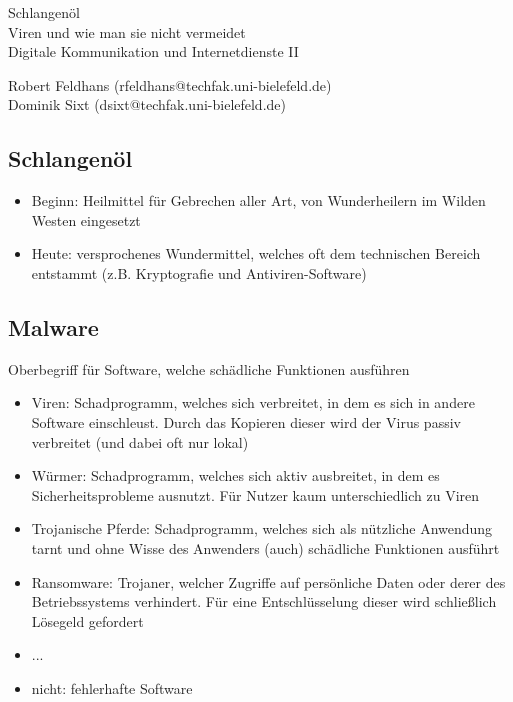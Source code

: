 \documentclass[
	11pt,
	DIV=15,
	parskip=full,    %
]{scrartcl}
\begin{document}
	\begin{center}
		\begin{onehalfspace}
			\Large{Schlangenöl\\Viren und wie man sie nicht vermeidet}\\
			\large{Digitale Kommunikation und Internetdienste II}\\
		\end{onehalfspace}
		\large{Robert Feldhans (rfeldhans@techfak.uni-bielefeld.de)}\\
		\large{Dominik Sixt (dsixt@techfak.uni-bielefeld.de)}
		\end{center}
	\hrulefill
	
	\subsection*{Schlangenöl}
	\begin{itemize}
		\itemsep-1pt
		\item Beginn: Heilmittel für Gebrechen aller Art, von Wunderheilern im Wilden Westen eingesetzt
		\item Heute: versprochenes Wundermittel, welches oft dem technischen Bereich entstammt (z.B. Kryptografie und Antiviren-Software)
	\end{itemize}
	
	\subsection*{Malware}
	Oberbegriff für Software, welche schädliche Funktionen ausführen
	
	\begin{itemize}
		\itemsep-1pt
		\item Viren: Schadprogramm, welches sich verbreitet, in dem es sich in andere Software einschleust. Durch das Kopieren dieser wird der Virus passiv verbreitet (und dabei oft nur lokal)
		\item Würmer: Schadprogramm, welches sich aktiv ausbreitet, in dem es Sicherheitsprobleme ausnutzt. Für Nutzer kaum unterschiedlich zu Viren
		\item Trojanische Pferde: Schadprogramm, welches sich als nützliche Anwendung tarnt und ohne Wisse des Anwenders (auch) schädliche Funktionen ausführt
		\item Ransomware: Trojaner, welcher Zugriffe auf persönliche Daten oder derer des Betriebssystems verhindert. Für eine Entschlüsselung dieser wird schließlich Lösegeld gefordert
		\item ...
		\item nicht: fehlerhafte Software	
	\end{itemize}
	
\end{document}
